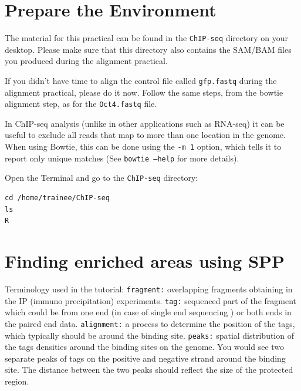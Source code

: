 \section{Prepare the Environment}

\begin{information}
The material for this practical can be found in the \texttt{ChIP-seq} directory on your
desktop. Please make sure that this directory also contains the SAM/BAM files you produced during the alignment practical. %
\end{information}

\begin{steps}
If you didn't have time to align the control file called \texttt{gfp.fastq}
during the alignment practical, please do it now. Follow the same steps, from
the bowtie alignment step, as for the \texttt{Oct4.fastq} file.
\end{steps}

\begin{note}
In ChIP-seq analysis (unlike in other applications such as RNA-seq) it can be useful
to exclude all reads that map to more than one location in the
genome. When using Bowtie, this can be done using the
\texttt{-m 1} option, which tells it to report only unique matches (See
\texttt{bowtie --help} for more details).
\end{note}


\begin{steps}
Open the Terminal and go to the \texttt{ChIP-seq} directory:
\begin{lstlisting}
cd /home/trainee/ChIP-seq
ls
R
\end{lstlisting}
\end{steps}

\section{Finding enriched areas using SPP}

\begin{information}
Terminology used in the tutorial:
\texttt{fragment:} overlapping fragments obtaining in the IP (immuno precipitation) experiments.
\texttt{tag:} sequenced part of the fragment which could be from one end (in case of single end sequencing ) or both ends in the paired end data.
\texttt{alignment:} a process to determine the position of the tags, which typically should be around the binding site.
\texttt{peaks:} spatial distribution of the tags densities around the binding sites on the genome. You would see two separate peaks of tags on the positive and negative strand around the binding site. 
The distance between the two peaks should reflect the size of the protected region.
\end{information}

